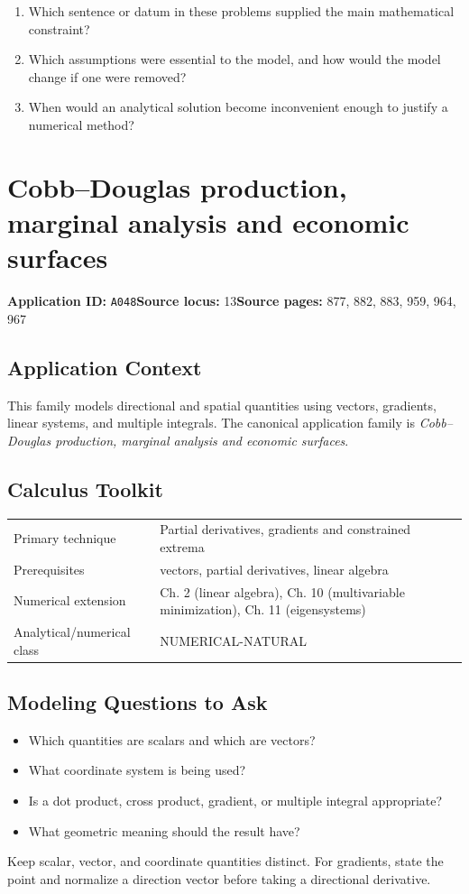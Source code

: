 \documentclass[11pt]{book}
\newcommand{\pid}[1]{\texttt{#1}}
\begin{document}
\begin{reflectionbox}\begin{enumerate}
\item Which sentence or datum in these problems supplied the main mathematical constraint?
\item Which assumptions were essential to the model, and how would the model change if one were removed?
\item When would an analytical solution become inconvenient enough to justify a numerical method?
\end{enumerate}\end{reflectionbox}
\chapter{Cobb–Douglas production, marginal analysis and economic surfaces}\label{app:A048}
\textbf{Application ID:} \pid{A048}\quad \textbf{Source locus:} 13\quad \textbf{Source pages:} 877, 882, 883, 959, 964, 967
\section*{Application Context}
This family models directional and spatial quantities using vectors, gradients, linear systems, and multiple integrals. The canonical application family is \emph{Cobb–Douglas production, marginal analysis and economic surfaces}.
\section*{Calculus Toolkit}
\begin{tabularx}{\textwidth}{@{}lX@{}}\toprule
Primary technique & Partial derivatives, gradients and constrained extrema \\
Prerequisites & vectors, partial derivatives, linear algebra \\
Numerical extension & Ch. 2 (linear algebra), Ch. 10 (multivariable minimization), Ch. 11 (eigensystems) \\
Analytical/numerical class & NUMERICAL-NATURAL \\
\bottomrule\end{tabularx}
\section*{Modeling Questions to Ask}\begin{itemize}
\item Which quantities are scalars and which are vectors?
\item What coordinate system is being used?
\item Is a dot product, cross product, gradient, or multiple integral appropriate?
\item What geometric meaning should the result have?
\end{itemize}
\begin{errorbox}Keep scalar, vector, and coordinate quantities distinct. For gradients, state the point and normalize a direction vector before taking a directional derivative.\end{errorbox}
\end{document}
